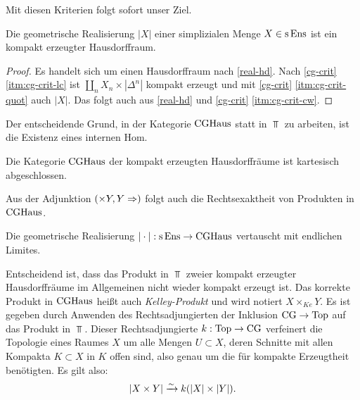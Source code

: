 Mit diesen Kriterien folgt sofort unser Ziel.
\begin{kor}
  Die geometrische Realisierung $|X|$ einer simplizialen Menge $X \in
  \operatorname{s}\operatorname{Ens}$ ist ein kompakt erzeugter Hausdorffraum.
\end{kor}
\begin{proof}
  Es handelt sich um einen Hausdorffraum nach \ref{real-hd}. Nach
  \ref{cg-crit} \ref{itm:cg-crit-lc} ist $\coprod_n X_n \times
  |\Delta^n|$ kompakt erzeugt und mit \ref{cg-crit}
  \ref{itm:cg-crit-quot} auch $|X|$. Das folgt auch aus \ref{real-hd}
  und \ref{cg-crit} \ref{itm:cg-crit-cw}.
\end{proof}

Der entscheidende Grund, in der Kategorie $\operatorname{CGHaus}$ statt in $\Top$ zu
arbeiten, ist die Existenz eines internen Hom.
\begin{theorem}
  \label{cghaus-cart-closed}
  Die Kategorie $\operatorname{CGHaus}$ der kompakt erzeugten Hausdorffräume ist
  kartesisch abgeschlossen.
\end{theorem}
Aus der Adjunktion $(\times Y, Y \Rightarrow)$ folgt auch die
Rechtsexaktheit von Produkten in $\operatorname{CGHaus}$.
\begin{satz} \label{real-products}
  Die geometrische Realisierung $|\cdot|: \operatorname{s}\operatorname{Ens} \to \operatorname{CGHaus}$
  vertauscht mit endlichen Limites.
\end{satz}
\begin{bem}
   Entscheidend ist, dass das Produkt in $\Top$ zweier kompakt
   erzeugter Hausdorffräume im Allgemeinen nicht wieder kompakt
   erzeugt ist. Das korrekte Produkt in $\operatorname{CGHaus}$ heißt auch
   \emph{Kelley-Produkt} und wird notiert $X \times_{Ke} Y$. Es ist
   gegeben durch Anwenden des Rechtsadjungierten der Inklusion $\operatorname{CG}
   \to \operatorname{Top}$ auf das Produkt in $\Top$. Dieser Rechtsadjungierte $k:
   \operatorname{Top} \to \operatorname{CG}$ verfeinert die Topologie eines Raumes $X$ um alle
   Mengen $U \subset X$, deren Schnitte mit allen Kompakta $K \subset
   X$ in $K$ offen sind, also genau um die für kompakte Erzeugtheit
   benötigten. Es gilt also:
   \[ |X \times Y| \xrightarrow[]{\sim} k(|X| \times |Y|). \]
\end{bem}

